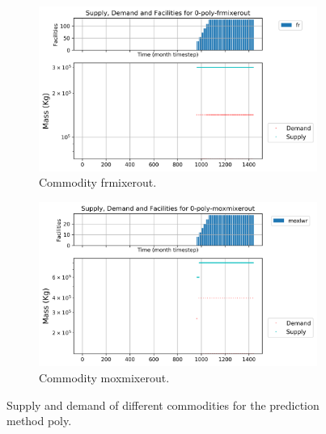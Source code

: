 \documentclass[11pt]{article}
\begin{document}
\begin{figure}[!h]
	\centering
	\begin{subfigure}[]{0.45\textwidth}
		\centering
		\includegraphics[width=\linewidth]{29-figures/0-poly-frmixerout.png} 
		\caption{Commodity frmixerout.}
		\label{fig:29-frmixerout}
	\end{subfigure}
	\vspace{1cm}
	\begin{subfigure}[]{0.45\textwidth}
		\centering
		\includegraphics[width=\linewidth]{29-figures/0-poly-moxmixerout.png} 
		\caption{Commodity moxmixerout.}
		\label{fig:29-moxmixerout}
	\end{subfigure}
	\hfill
	\caption{Supply and demand of different commodities for the prediction method poly.}
	\label{fig:29-mix}
\end{figure}
\end{document}
